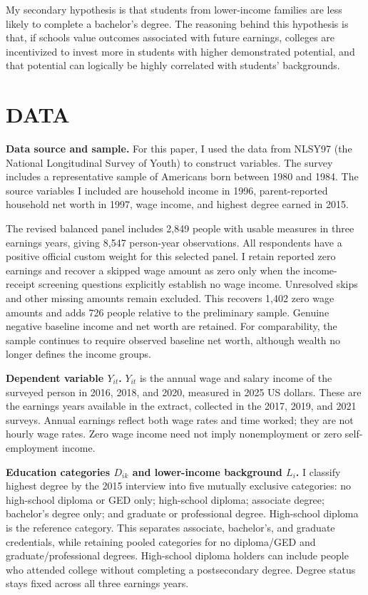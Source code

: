 \documentclass[12pt,letterpaper]{article}
\begin{document}
My secondary hypothesis is that students from lower-income families are less likely to
complete a bachelor's degree. The reasoning behind this hypothesis is that, if schools
value outcomes associated with future earnings, colleges are incentivized to invest more
in students with higher demonstrated potential, and that potential can logically be
highly correlated with students' backgrounds.

\section*{DATA}
\textbf{Data source and sample.}
For this paper, I used the data from NLSY97 (the National Longitudinal Survey of Youth)
to construct variables. The survey includes a representative sample of Americans born
between 1980 and 1984. The source variables I included are household income in 1996,
parent-reported household net worth in 1997, wage income, and highest degree earned in 2015.

The revised balanced panel includes 2,849 people with usable measures in three
earnings years, giving 8,547 person-year observations. All respondents have a positive
official custom weight for this selected panel. I retain reported zero earnings and
recover a skipped wage amount as zero only when the income-receipt screening
questions explicitly establish no wage income. Unresolved skips and other missing
amounts remain excluded. This recovers 1,402 zero wage amounts and adds 726 people
relative to the preliminary sample. Genuine negative baseline income and net worth
are retained. For comparability, the sample continues to require observed baseline
net worth, although wealth no longer defines the income groups.

\textbf{Dependent variable $Y_{it}$.}
$Y_{it}$ is the annual wage and salary income of the surveyed person in 2016, 2018,
and 2020, measured in 2025 US dollars. These are the earnings years available in the
extract, collected in the 2017, 2019, and 2021 surveys.
Annual earnings reflect both wage rates and time worked; they are not hourly wage
rates. Zero wage income need not imply nonemployment or zero self-employment income.

\textbf{Education categories $D_{ik}$ and lower-income background $L_i$.}
I classify highest degree by the 2015 interview into five mutually exclusive
categories: no high-school diploma or GED only; high-school diploma; associate
degree; bachelor's degree only; and graduate or professional degree. High-school
diploma is the reference category. This separates associate, bachelor's, and
graduate credentials, while retaining pooled categories for no diploma/GED and
graduate/professional degrees. High-school diploma holders can include people who
attended college without completing a postsecondary degree. Degree status stays
fixed across all three earnings years.
\end{document}

